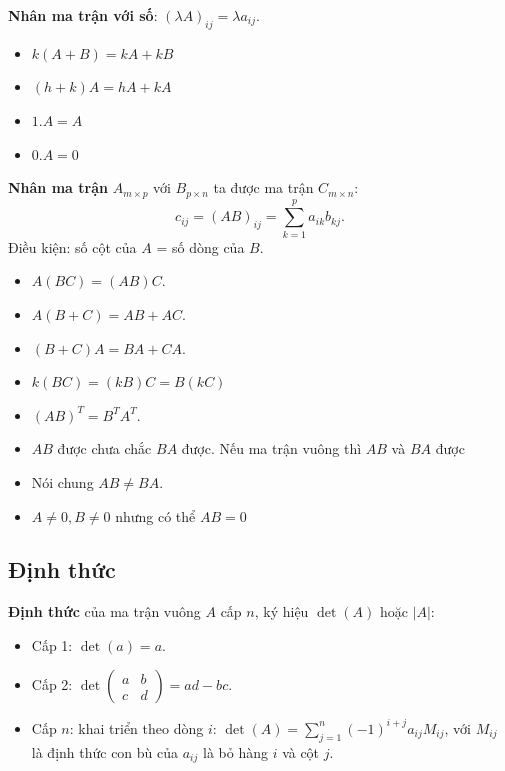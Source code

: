 \documentclass[12pt,a4paper]{article}
\begin{document}
\begin{dinhnghia}
  \textbf{Nhân ma trận với số}: $(\lambda A)_{ij} = \lambda a_{ij}$.
\end{dinhnghia}

\begin{tinhchat}
  \begin{itemize}
    \item $k(A + B) = kA + kB$
    \item $(h + k)A = hA + kA$
    \item $1.A = A$
    \item $0.A = 0$
  \end{itemize}
\end{tinhchat}

\begin{dinhnghia}
  \textbf{Nhân ma trận} $A_{m \times p}$ với $B_{p \times n}$ ta được ma trận $C_{m \times n}$:
  \[
    c_{ij} = (AB)_{ij} = \sum_{k=1}^{p} a_{ik} b_{kj}.
  \]
  Điều kiện: số cột của $A$ = số dòng của $B$.
\end{dinhnghia}

\begin{tinhchat}
  \begin{itemize}
    \item $A(BC) = (AB)C$.
    \item $A(B + C) = AB + AC$.
    \item $(B + C)A = BA + CA$.
    \item $k(BC) = (kB)C = B(kC)$
    \item $(AB)^T = B^T A^T$.
    \item $AB$ được chưa chắc $BA$ được. Nếu ma trận vuông thì $AB$ và $BA$ được
    \item Nói chung $AB \ne BA$.
    \item $A \ne 0, B \ne 0$ nhưng có thể $AB = 0$
  \end{itemize}
\end{tinhchat}

\subsection{Định thức}

\begin{dinhnghia}
  \textbf{Định thức} của ma trận vuông $A$ cấp $n$, ký hiệu $\det(A)$ hoặc $|A|$:
  \begin{itemize}
    \item Cấp 1: $\det(a) = a$.
    \item Cấp 2: $\det\begin{pmatrix} a & b \\ c & d \end{pmatrix} = ad - bc$.
    \item Cấp $n$: khai triển theo dòng $i$: $\det(A) = \sum_{j=1}^{n} (-1)^{i+j} a_{ij} M_{ij}$, với $M_{ij}$ là định thức con bù của $a_{ij}$ là bỏ hàng $i$ và cột $j$.
  \end{itemize}
\end{dinhnghia}
\end{document}
